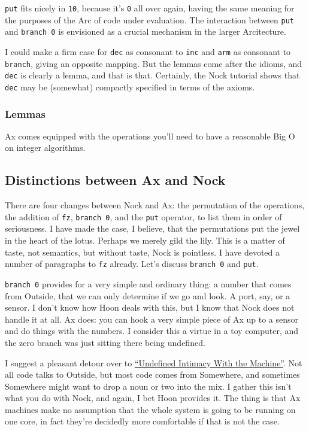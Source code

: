 \documentclass[twoside]{article}
\begin{document}
\texttt{put} fits nicely in \texttt{10}, because it's \texttt{0} all over again, having the same meaning for the purposes of the Arc of code under evaluation. The interaction between \texttt{put} and \texttt{branch 0} is envisioned as a crucial mechanism in the larger Arcitecture. 

I could make a firm case for \texttt{dec} as consonant to \texttt{inc} and \texttt{arm} as consonant to \texttt{branch}, giving an opposite mapping. But the lemmas come after the idioms, and \texttt{dec} is clearly a lemma, and that is that. Certainly, the Nock tutorial shows that \texttt{dec} may be (somewhat) compactly specified in terms of the axioms.

\subsubsection{Lemmas}

Ax comes equipped with the operations you'll need to have a reasonable Big O on integer algorithms.


\subsection{Distinctions between Ax and Nock}

There are four changes between Nock and Ax: the permutation of the operations, the addition of \texttt{fz}, \texttt{branch 0}, and the \texttt{put} operator, to list them in order of seriousness. I have made the case, I believe, that the permutations put the jewel in the heart of the lotus. Perhaps we merely gild the lily. This is a matter of taste, not semantics, but without taste, Nock is pointless. I have devoted a number of paragraphs to \texttt{fz} already. Let's discuss \texttt{branch 0} and \texttt{put}.

\texttt{branch 0} provides for a very simple and ordinary thing: a number that comes from Outside, that we can only determine if we go and look. A port, say, or a sensor. I don't know how Hoon deals with this, but I know that Nock does not handle it at all. Ax does: you can hook a very simple piece of Ax up to a sensor and do things with the numbers. I consider this a virtue in a toy computer, and the zero branch was just sitting there being undefined. 

I suggest a pleasant detour over to \href{http://thoughtmesh.net/publish/367.php}{``Undefined Intimacy With the Machine''}. %
Not all code talks to Outside, but most code comes from Somewhere, and sometimes Somewhere might want to drop a noun or two into the mix. I gather this isn't what you do with Nock, and again, I bet Hoon provides it. The thing is that Ax machines make no assumption that the whole system is going to be running on one core, in fact they're decidedly more comfortable if that is not the case. 
\end{document}
